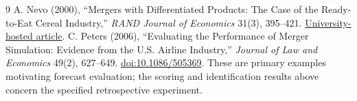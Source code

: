 \documentclass[11pt,a4paper]{article}
\theoremstyle{remark}
\begin{document}
\begin{thebibliography}{9}
 A. Nevo (2000), ``Mergers with Differentiated Products: The Case of the Ready-to-Eat Cereal Industry,'' \emph{RAND Journal of Economics} 31(3), 395--421. \href{https://pages.stern.nyu.edu/~acollard/NevoRand.pdf}{University-hosted article}.
 C. Peters (2006), ``Evaluating the Performance of Merger Simulation: Evidence from the U.S. Airline Industry,'' \emph{Journal of Law and Economics} 49(2), 627--649. \href{https://doi.org/10.1086/505369}{doi:10.1086/505369}. These are primary examples motivating forecast evaluation; the scoring and identification results above concern the specified retrospective experiment.
\end{thebibliography}
\end{document}
